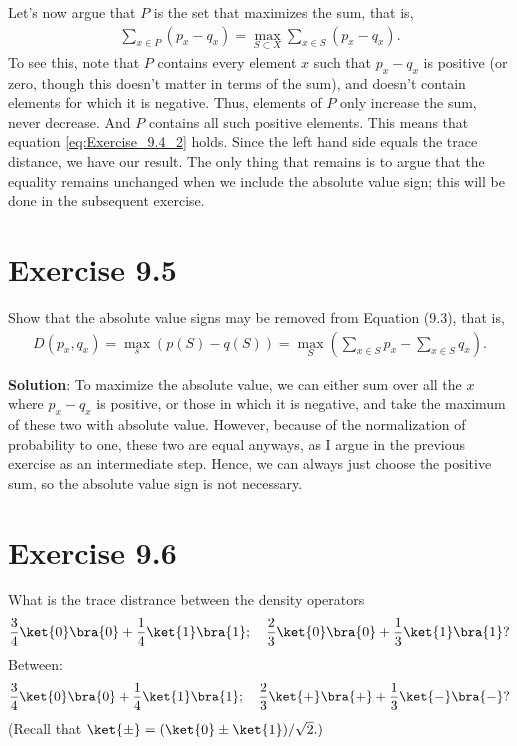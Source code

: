 \documentclass{book}
\begin{document}
    Let's now argue that $P$ is the set that maximizes the sum, that is,
    \begin{align} \label{eq:Exercise_9.4_2}
        \sum_{x\in P } (p_x-q_x) = \max_{S\subset X} \sum_{x\in S} (p_x -q_x).
    \end{align}
    To see this, note that $P$ contains every element $x$ such that $p_x-q_x$ is positive (or zero, though this doesn't matter in terms of the sum), and doesn't contain elements for which it is negative. Thus, elements of $P$ only increase the sum, never decrease. And $P$ contains all such positive elements. This means that equation \eqref{eq:Exercise_9.4_2} holds. Since the left hand side equals the trace distance, we have our result. The only thing that remains is to argue that the equality remains unchanged when we include the absolute value sign; this will be done in the subsequent exercise. 
    
\section*{Exercise 9.5}
    Show that the absolute value signs may be removed from Equation (9.3), that is,
    \begin{align}
        D(p_x, q_x) = \max_s (p(S)-q(S)) = \max_S \left(\sum_{x\in S} p_x -\sum_{x\in S} q_x\right).
    \end{align}
    
    \textbf{Solution}: To maximize the absolute value, we can either sum over all the $x$ where $p_x-q_x$ is positive, or those in which it is negative, and take the maximum of these two with absolute value. However, because of the normalization of probability to one, these two are equal anyways, as I argue in the previous exercise as an intermediate step. Hence, we can always just choose the positive sum, so the absolute value sign is not necessary. 
    
\section*{Exercise 9.6}
    What is the trace distrance between the density operators
    \begin{align}
        \frac{3}{4}\ket{0}\bra{0}+\frac{1}{4}\ket{1}\bra{1};\quad \frac{2}{3}\ket{0}\bra{0}+\frac{1}{3}\ket{1}\bra{1}?
    \end{align}
    Between:
    \begin{align}
        \frac{3}{4}\ket{0}\bra{0}+\frac{1}{4}\ket{1}\bra{1};\quad \frac{2}{3}\ket{+}\bra{+}+\frac{1}{3}\ket{-}\bra{-}?
    \end{align}
    (Recall that $\ket{\pm} = (\ket{0}\pm\ket{1})/\sqrt{2}.)$
    
\end{document}
